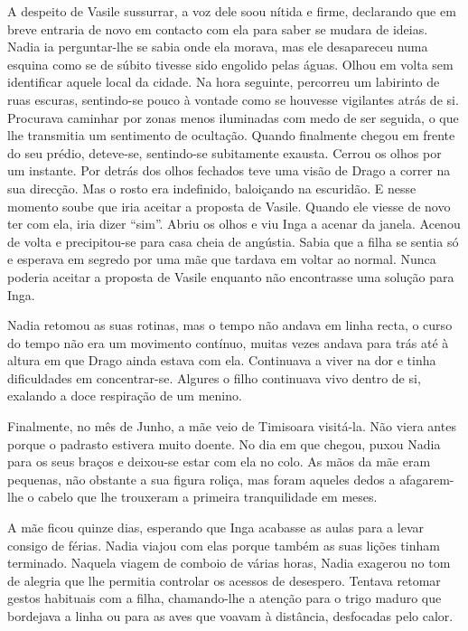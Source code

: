 A despeito de Vasile sussurrar, a voz dele soou nítida e
firme, declarando que em breve entraria de novo em contacto com ela
para saber se mudara de ideias. Nadia ia perguntar-lhe se sabia onde ela
morava, mas ele desapareceu numa esquina como se de súbito tivesse
sido engolido pelas águas. Olhou em volta sem identificar aquele local
da cidade. Na hora seguinte, percorreu um labirinto de ruas escuras,
sentindo-se pouco à vontade como se houvesse vigilantes atrás de si.
Procurava caminhar por zonas menos iluminadas com medo de ser seguida, o
que lhe transmitia um sentimento de ocultação. Quando finalmente
chegou em frente do seu prédio, deteve-se, sentindo-se subitamente exausta. Cerrou os olhos por um instante. Por detrás dos
olhos fechados teve uma visão de Drago a
correr na sua direcção. Mas o rosto era indefinido, baloiçando na
escuridão. E nesse momento soube que iria aceitar a proposta de Vasile.
Quando ele viesse de novo ter com ela, iria dizer ``sim''. Abriu os olhos
e viu Inga a acenar da janela. Acenou de volta e precipitou-se para
casa cheia de angústia. Sabia que a filha se sentia só e esperava em
segredo por uma mãe que tardava em voltar ao normal. Nunca poderia
aceitar a proposta de Vasile enquanto não encontrasse uma solução para
Inga.

Nadia retomou as suas rotinas, mas o tempo não andava em linha recta, o
curso do tempo não era um movimento contínuo, muitas vezes andava para
trás até à altura em que Drago ainda estava com ela. Continuava a viver
na dor e tinha dificuldades em concentrar-se. Algures o filho continuava
vivo dentro de si, exalando a doce respiração de um menino.

Finalmente, no mês de Junho, a mãe veio de Timisoara visitá-la. Não
viera antes porque o padrasto estivera muito doente. No dia em que
chegou, puxou Nadia para os seus braços e deixou-se estar com ela no
colo. As mãos da mãe eram pequenas, não obstante a sua figura roliça,
mas foram aqueles dedos a afagarem-lhe o cabelo que lhe trouxeram a
primeira tranquilidade em meses.

A mãe ficou quinze dias, esperando que Inga acabasse as aulas para a
levar consigo de férias. Nadia viajou com elas porque também as suas
lições tinham terminado. Naquela viagem de comboio de várias horas,
Nadia exagerou no tom de alegria que lhe permitia controlar os acessos
de desespero. Tentava retomar gestos habituais
com a filha, chamando-lhe a atenção para o trigo maduro que bordejava a
linha ou para as aves que voavam à distância, desfocadas pelo calor.

